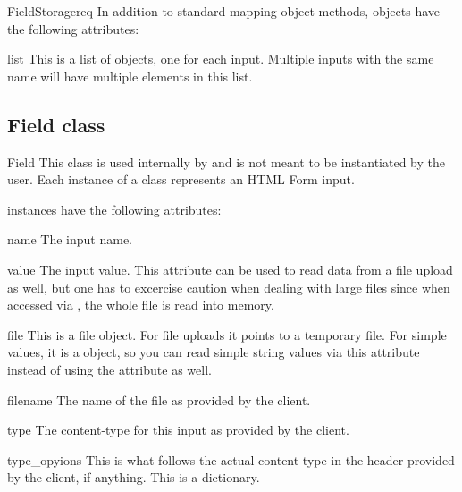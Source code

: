 \begin{classdesc}{FieldStorage}{req}
In addition to standard mapping object methods,  objects
have the following attributes:

\begin{memberdesc}{list}
This is a list of  objects, one for each input. Multiple
inputs with the same name will have multiple elements in this list.
\end{memberdesc}

\end{classdesc}

\subsection{Field class\label{pyapi-util-fstor-fld}}

\begin{classdesc}{Field}{}
This class is used internally by  and is not
meant to be instantiated by the user. Each instance of a 
class represents an HTML Form input.

 instances have the following attributes:

\begin{memberdesc}{name}
The input name.
\end{memberdesc}

\begin{memberdesc}{value}
The input value. This attribute can be used to read data from a file
upload as well, but one has to excercise caution when dealing with
large files since when accessed via , the whole file is
read into memory.
\end{memberdesc}

\begin{memberdesc}{file}
This is a file object. For file uploads it points to a temporary file.
For simple values, it is a  object, so you can read
simple string values via this attribute instead of using the 
attribute as well.
\end{memberdesc}

\begin{memberdesc}{filename}
The name of the file as provided by the client.
\end{memberdesc}

\begin{memberdesc}{type}
The content-type for this input as provided by the client.
\end{memberdesc}

\begin{memberdesc}{type_opyions}
This is what follows the actual content type in the 
header provided by the client, if anything. This is a dictionary.
\end{memberdesc}


\end{classdesc}
